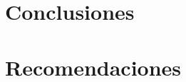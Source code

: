 \documentclass[a4paper,10pt,twocolumn]{article}
\begin{document}
\section{Conclusiones}\label{sec:conc}





\section{Recomendaciones}\label{sec:rec}





\begin{thebibliography}{99}



\end{thebibliography}


\label{end}
\end{document}
